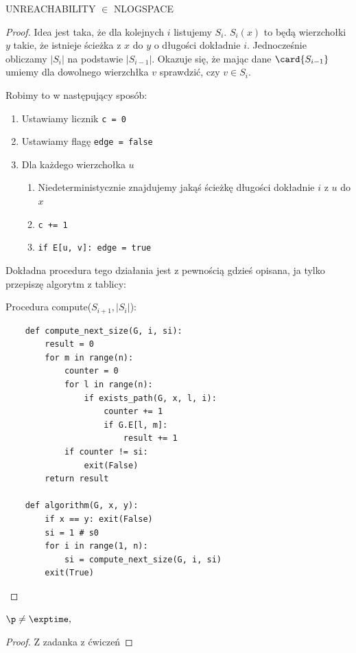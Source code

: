 \begin{theorem} 
    \textsc{UNREACHABILITY} \(\in\) \textsc{NLOGSPACE} 
\end{theorem}
\begin{proof}
    Idea jest taka, że dla kolejnych \( i \) listujemy \(S_i\). \(S_i(x)\) to będą wierzchołki \(y\) takie, że istnieje ścieżka z \(x\) do \(y\) o długości dokładnie \(i\).  Jednocześnie obliczamy \(|S_i|\) na podstawie \(|S_{i-1}|\). 
    Okazuje się, że mając dane \( \card{S_{i - 1}} \) umiemy dla dowolnego wierzchłka \( v \) sprawdzić, czy \( v \in S_i \).
        
    Robimy to w następujący sposób:
    \begin{enumerate}
        \item Ustawiamy licznik \texttt{c = 0}
        \item Ustawiamy flagę \texttt{edge = false}
        \item Dla każdego wierzchołka \( u \)
        \begin{enumerate}
            \item Niedeterministycznie znajdujemy jakąś ścieżkę długości dokładnie \( i \) z \( u \) do \( x \)
            \item \texttt{c += 1}
            \item \texttt{if E[u, v]: edge = true}
        \end{enumerate}
    \end{enumerate}
    
    
    Dokładna procedura tego działania jest z pewnością gdzieś opisana, ja tylko przepiszę algorytm z tablicy:
    
    Procedura compute(\(S_{i+1}, |S_i|\)):

    \begin{verbatim}
    def compute_next_size(G, i, si):
        result = 0
        for m in range(n):
            counter = 0
            for l in range(n):
                if exists_path(G, x, l, i):
                    counter += 1
                    if G.E[l, m]:
                        result += 1
            if counter != si:
                exit(False)
        return result
        
    def algorithm(G, x, y):
        if x == y: exit(False)
        si = 1 # s0
        for i in range(1, n):
            si = compute_next_size(G, i, si)
        exit(True)
    \end{verbatim}
\end{proof}

\begin{theorem}
    \(\p \neq  \exptime, \)
\end{theorem}
\begin{proof}
    Z zadanka z ćwiczeń
\end{proof}